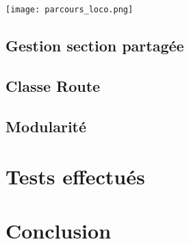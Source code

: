 \documentclass{article}
\begin{document}
\begin{center}
\texttt{[image: parcours\_loco.png]}
\end{center}

\subsection*{Gestion section partagée}

\subsection*{Classe Route}

\subsection*{Modularité}

\section*{Tests effectués}
\noindent

\section*{Conclusion}
\noindent
\end{document}
